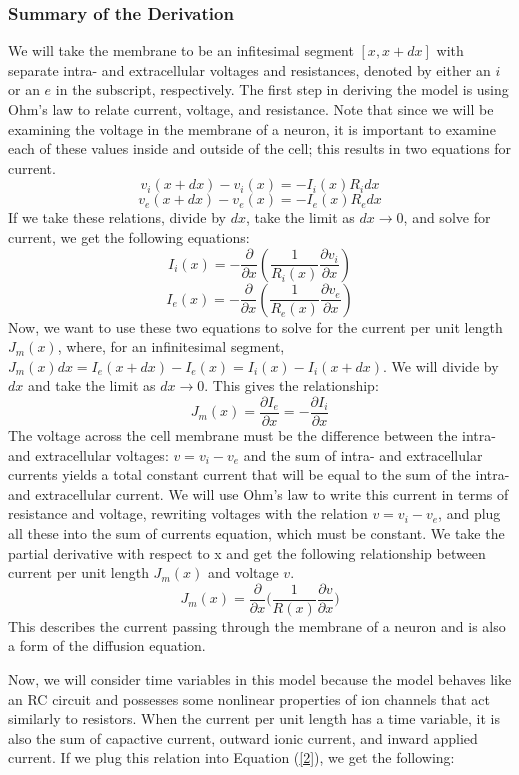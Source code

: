 \documentclass[12pt]{article}
\begin{document}
\subsubsection{Summary of the Derivation}
We will take the membrane to be an infitesimal segment $[x, x+dx]$ with separate intra- and extracellular voltages and resistances, denoted by either an $i$ or an $e$ in the subscript, respectively. The first step in deriving the model is using Ohm's law to relate current, voltage, and resistance. Note that since we will be examining the voltage in the membrane of a neuron, it is important to examine each of these values inside and outside of the cell; this results in two equations for current. 
\[v_i(x+dx)-v_i(x)=-I_i(x)R_idx\]
\[v_e(x+dx)-v_e(x)=-I_e(x)R_edx\]
If we take these relations, divide by $dx$,  take the limit as $dx\rightarrow 0$, and solve for current, we get the following equations:
\[I_i(x)=-\frac{\partial}{\partial{x}}(\frac{1}{R_i(x)}\frac{\partial{v_i}}{\partial{x}})\]
\[I_e(x)=-\frac{\partial}{\partial{x}}(\frac{1}{R_e(x)}\frac{\partial{v_e}}{\partial{x}})\]
Now, we want to use these two equations to solve for the current per unit length $J_m(x)$, where, for an infinitesimal segment, $J_m(x)dx=I_e(x+dx)-I_e(x)=I_i(x)-I_i(x+dx)$. We will divide by $dx$ and take the limit as $dx\rightarrow 0$. This gives the relationship:
\[J_m(x)=\frac{\partial{I_e}}{\partial{x}}=-\frac{\partial{I_i}}{\partial{x}}\]
The voltage across the cell membrane must be the difference between the intra- and extracellular voltages: $v=v_i-v_e$ and the sum of intra- and extracellular currents yields a total constant current that will be equal to the sum of the intra- and extracellular current. We will use Ohm's law to write this current in terms of resistance and voltage, rewriting voltages with the relation $v=v_i-v_e$, and plug all these into the sum of currents equation, which must be constant. We take the partial derivative with respect to x and get the following relationship between current per unit length $J_m(x)$ and voltage $v$.
\begin{equation} \label{2}
J_m(x)=\frac{\partial}{\partial{x}}\bigg(\frac{1}{R(x)}\frac{\partial{v}}{\partial{x}}\bigg)
\end {equation}
This describes the current passing through the membrane of a neuron and is also a form of the diffusion equation.\par
Now, we will consider time variables in this model because the model behaves like an RC circuit and possesses some nonlinear properties of ion channels that act similarly to resistors. When the current per unit length has a time variable, it is also the sum of capactive current, outward ionic current, and inward applied current. If we plug this relation into Equation (\ref{2}), we get the following:
\end{document}
